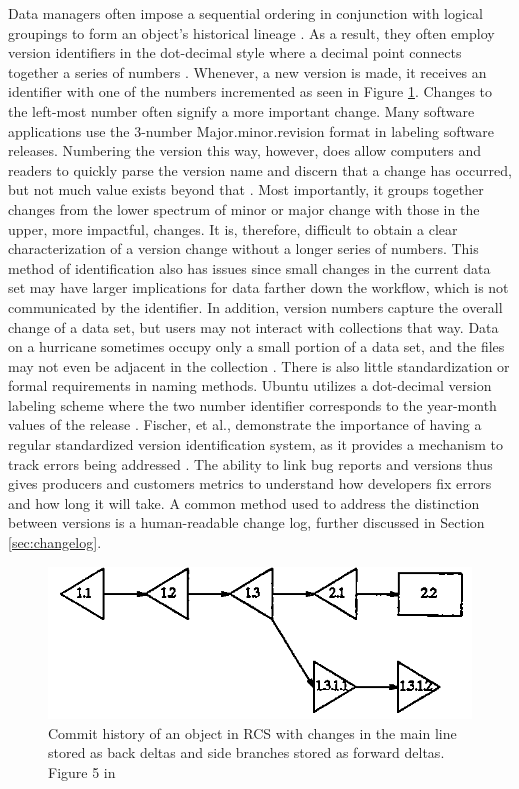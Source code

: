 Data managers often impose a sequential ordering in conjunction with logical groupings to form an object's historical lineage \cite{barkstrom2014earth}.
As a result, they often employ version identifiers in the dot-decimal style where a decimal point connects together a series of numbers \cite{Stuckenholz:2005:CEV:1039174.1039197}.
Whenever, a new version is made, it receives an identifier with one of the numbers incremented as seen in Figure \ref{RCSTree}.
Changes to the left-most number often signify a more important change.
Many software applications use the 3-number Major.minor.revision format in labeling software releases.
Numbering the version this way, however, does allow computers and readers to quickly parse the version name and discern that a change has occurred, but not much value exists beyond that \cite{Dijkstra1994}.
Most importantly, it groups together changes from the lower spectrum of minor or major change with those in the upper, more impactful, changes.
It is, therefore, difficult to obtain a clear characterization of a version change without a longer series of numbers.
This method of identification also has issues since small changes in the current data set may have larger implications for data farther down the workflow, which is not communicated by the identifier.
In addition, version numbers capture the overall change of a data set, but users may not interact with collections that way.
Data on a hurricane sometimes occupy only a small portion of a data set, and the files may not even be adjacent in the collection \cite{Barkstrom_digitallibrary}.
There is also little standardization or formal requirements in naming methods.
Ubuntu utilizes a dot-decimal version labeling scheme where the two number identifier corresponds to the year-month values of the release \cite{Ubuntu}.
Fischer, et al., demonstrate the importance of having a regular standardized version identification system, as it provides a mechanism to track errors being addressed \cite{Fischer2003}.
The ability to link bug reports and versions thus gives producers and customers metrics to understand how developers fix errors and how long it will take.
A common method used to address the distinction between versions is a human-readable change log, further discussed in Section \ref{sec:changelog}.


\begin{figure}
	\centering
	\includegraphics[scale=0.75]{figures/RCSCommitTree.png}
	\caption[Commit history of an object in RCS with changes in the main line stored as back deltas and side branches stored as forward deltas.]{Commit history of an object in RCS with changes in the main line stored as back deltas and side branches stored as forward deltas.  Figure 5 in \cite{tichy1985rcs}}
	\label{RCSTree}
\end{figure}

